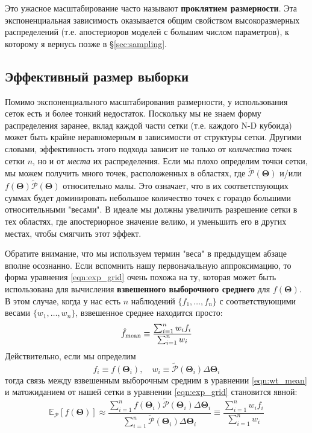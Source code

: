 \documentclass[12pt, titlepage]{article}
\newcommand{\meanwrt}[2]{\ensuremath{\mathbb{E}_{{#2}}\left[{#1}\right]}}
\newcommand{\params}{\ensuremath{\boldsymbol\Theta}}
\newcommand{\posterior}{\ensuremath{\mathcal{P}}}
\begin{document}
Это ужасное масштабирование часто называют \textbf{проклятием размерности}. Эта экспоненциальная зависимость оказывается общим свойством высокоразмерных распределений (т.е. апостериоров моделей с большим числом параметров), к которому я вернусь позже в \S\ref{sec:sampling}.

\subsection{Эффективный размер выборки} \label{subsec:ess}

Помимо экспоненциального масштабирования размерности, у использования сеток есть и более тонкий недостаток. Поскольку мы не знаем форму распределения заранее, вклад каждой части сетки (т.е. каждого N-D кубоида) может быть крайне неравномерным в зависимости от структуры сетки. Другими словами, эффективность этого подхода зависит не только от \textit{количества} точек сетки $n$, но и от \textit{места} их распределения. Если мы плохо определим точки сетки, мы можем получить много точек, расположенных в областях, где $\tilde{\posterior}(\params)$ и/или $f(\params)\tilde{\posterior}(\params)$ относительно малы. Это означает, что в их соответствующих суммах будет доминировать небольшое количество точек с гораздо большими относительными "весами". В идеале мы должны увеличить разрешение сетки в тех областях, где апостериорное значение велико, и уменьшить его в других местах, чтобы смягчить этот эффект. 

Обратите внимание, что мы используем термин "веса" в предыдущем абзаце вполне осознанно. Если вспомнить нашу первоначальную аппроксимацию, то форма уравнения \eqref{eqn:exp_grid} очень похожа на ту, которая может быть использована для вычисления \textbf{взвешенного выборочного среднего} для $f(\params)$. В этом случае, когда у нас есть $n$ наблюдений $\{ f_1, \dots, f_n \}$ с соответствующими весами $\{ w_1, \dots, w_n \}$, взвешенное среднее находится просто:
\begin{equation} \label{eqn:wt_mean}
    \hat{f}_{\rm mean} \equiv \frac{\sum_{i=1}^{n} w_i f_i}
    {\sum_{i=1}^{n} w_i}
\end{equation}
Действительно, если мы определим
\begin{equation}
    f_i \equiv f(\params_i),
    \quad 
    w_i \equiv \tilde{\posterior}(\params_i) \Delta \params_i
\end{equation}
тогда связь между взвешенным выборочным средним в уравнении \eqref{eqn:wt_mean} и матожиданием от нашей сетки в уравнении \eqref{eqn:exp_grid} становится явной:
\begin{equation}
    \meanwrt{f(\params)}{\posterior}
    \approx \frac{\sum_{i=1}^{n} f(\params_i) 
    \tilde{\posterior}(\params_i) \Delta \params_i}
    {\sum_{i=1}^{n} \tilde{\posterior}(\params_i) \Delta \params_i}
    \equiv \frac{\sum_{i=1}^{n} w_i f_i}
    {\sum_{i=1}^{n} w_i}
\end{equation}
\end{document}
